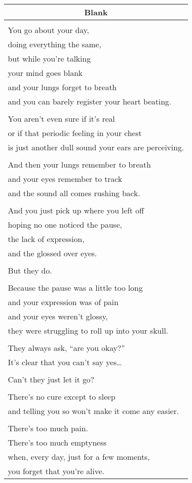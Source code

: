 \documentclass{article}
\begin{document}
\begin{center}
\begin{tabular}{l}
\multicolumn{1}{c}{\textbf{Blank}} \\ \hline
\\
You go about your day, \\
doing everything the same, \\
but while you're talking \\
your mind goes blank \\
and your lungs forget to breath \\
and you can barely register your heart beating. \\
\\
You aren't even sure if it's real \\
or if that periodic feeling in your chest \\
is just another dull sound your ears are perceiving. \\
\\
And then your lungs remember to breath \\
and your eyes remember to track \\
and the sound all comes rushing back. \\
\\
And you just pick up where you left off \\
hoping no one noticed the pause, \\
the lack of expression, \\
and the glossed over eyes. \\
\\
But they do. \\
\\
Because the pause was a little too long \\
and your expression was of pain \\
and your eyes weren't glossy, \\
they were struggling to roll up into your skull. \\
\\
They always ask, ``are you okay?'' \\
It's clear that you can't say yes\ldots{} \\
\\
Can't they just let it go? \\
\\
There's no cure except to sleep \\
and telling you so won't make it come any easier. \\
\\
There's too much pain. \\
There's too much emptyness \\
when, every day, just for a few moments, \\
you forget that you're alive. \\
\end{tabular}
\end{center}
\end{document}
